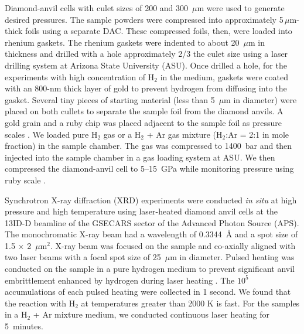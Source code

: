 \documentclass[draft,jgrga,12pt]{agujournal2019}
\begin{document}
Diamond-anvil cells with culet sizes of 200 and 300~{$\mu\mathrm{m}$} were used to generate desired pressures. 
The sample powders were compressed into approximately 5\,{$\mu\mathrm{m}$}-thick foils using a separate DAC\@. 
These compressed foils, then, were loaded into rhenium gaskets. 
The rhenium gaskets were indented to about 20~{$\mu\mathrm{m}$} in thickness and drilled with a hole approximately 2/3 the culet size using a laser drilling system at Arizona State University (ASU). 
Once drilled a hole, for the experiments with high concentration of H$_2$ in the medium,  gaskets  were coated with an 800-nm thick layer of gold to prevent hydrogen from diffusing into the gasket. 
Several tiny pieces of starting material (less than 5~$\mu$m in diameter) were placed on both cullets to separate the sample foil from the  diamond anvils. 
A gold grain and a ruby chip was placed adjacent to the sample foil as pressure scales \cite{fei_internally_2007, mao_calibration_1986}. %
We loaded pure H$_2$ gas or a H$_2$ + Ar gas mixture (H$_2$:Ar = 2:1 in mole fraction)  in the sample chamber. 
The gas was compressed to 1400~bar and then injected into the sample chamber in a gas loading system at ASU\@. 
We then compressed the diamond-anvil cell to 5--15~GPa while monitoring pressure using ruby scale \cite{mao_calibration_1986}. 

Synchrotron X-ray diffraction (XRD) experiments were conducted \textit{in situ} at high pressure and high temperature using laser-heated diamond anvil cells at the 13ID-D beamline of the GSECARS sector of the Advanced Photon Source (APS). 
The monochromatic X-ray beam  had a wavelength of 0.3344~{\AA} and a spot size of 1.5 $\times$ 2~$\mu$m$^2$. 
X-ray beam was focused on the sample and co-axially aligned with two laser  beams with a focal spot size of 25~$\mu$m in diameter.  
Pulsed heating was conducted on the sample in a pure hydrogen medium to prevent significant anvil embrittlement enhanced by hydrogen during laser heating \cite{prakapenka_advanced_2008,silvera_metallic_2018}. %
The $10^5$ accumulations of each pulsed heating were collected in 1 second. 
We found that the reaction with H$_2$ at temperatures greater than 2000 {K} is fast. 
For the samples in a H$_2$ + Ar mixture medium, we conducted continuous laser heating for 5~minutes. 
\end{document}
